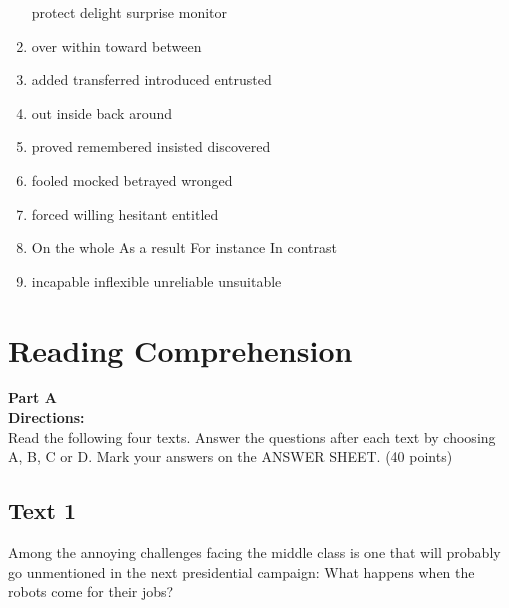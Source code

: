 \begin{enumerate}
\fourchoices
{protect}
{delight}
{surprise}
{monitor}


\item

\fourchoices
{over}
{within}
{toward}
{between}


\item

\fourchoices
{added}
{transferred}
{introduced}
{entrusted}



\item

\fourchoices
{out}
{inside}
{back}
{around}


\item

\fourchoices
{proved}
{remembered}
{insisted}
{discovered}


\item

\fourchoices
{fooled}
{mocked}
{betrayed}
{wronged}



\item

\fourchoices
{forced}
{willing}
{hesitant}
{entitled}


\item

\fourchoices
{On the whole}
{As a result}
{For instance}
{In contrast}


\item

\fourchoices
{incapable}
{inflexible}
{unreliable}
{unsuitable}

\end{enumerate}

\vfil

\section{Reading Comprehension}


\noindent
\textbf{Part A}\\
\textbf{Directions:}\\
Read the following four texts. Answer the questions after each text by
choosing A, B, C or
D. Mark your answers on the ANSWER SHEET. (40
points)

\newpage
\subsection{Text 1}


Among the annoying challenges facing the middle class is one that will
probably go unmentioned in the next presidential campaign: What happens
when the robots come for their jobs?

